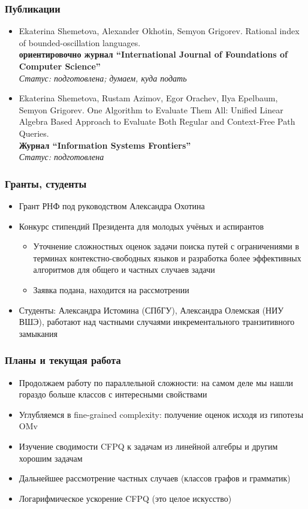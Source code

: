 \documentclass{beamer}
\begin{document}
\begin{frame}
\frametitle{Публикации }
\begin{itemize}
\item Ekaterina Shemetova, Alexander Okhotin, Semyon Grigorev. Rational index of bounded-oscillation languages.
\\\textbf{ориентировочно журнал ``International Journal of Foundations of Computer Science''} 
\\\textit{Статус: подготовлена; думаем, куда подать}
\item Ekaterina Shemetova, Rustam Azimov, Egor Orachev, Ilya Epelbaum, Semyon Grigorev. One Algorithm to Evaluate Them All: Unified Linear Algebra Based Approach to Evaluate Both Regular and Context-Free Path Queries.
\\ \textbf{Журнал ``Information Systems Frontiers''}
\\\textit{Статус: подготовлена }
\end{itemize}
\end{frame}

\begin{frame}
\frametitle{Гранты, студенты}
\begin{itemize}
\item Грант РНФ под руководством Александра Охотина
\item Конкурс стипендий Президента для молодых учёных и аспирантов
\begin{itemize}
\item Уточнение сложностных оценок задачи поиска путей с ограничениями в терминах контекстно-свободных языков и разработка более эффективных алгоритмов для общего и частных случаев задачи
\item Заявка подана, находится на рассмотрении
\end{itemize}
\item Студенты: Александра Истомина (СПбГУ), Александра Олемская (НИУ ВШЭ), работают над частными случаями инкрементального транзитивного замыкания
\end{itemize}
\end{frame}

\begin{frame}
\frametitle{Планы и текущая работа}
\begin{itemize}
\item Продолжаем работу по параллельной сложности: на самом деле мы нашли гораздо больше классов с интересными свойствами
\item Углубляемся в fine-grained complexity: получение оценок исходя из гипотезы OMv
\item Изучение сводимости CFPQ к задачам из линейной алгебры и другим хорошим задачам
\item Дальнейшее рассмотрение частных случаев (классов графов и грамматик)
\item Логарифмическое ускорение CFPQ (это целое искусство)
\end{itemize}

\end{frame}
\end{document}
